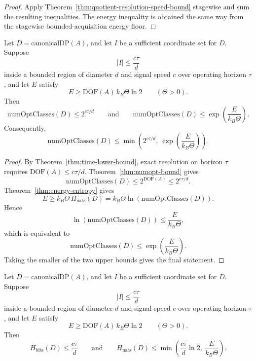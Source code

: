 \begin{proof}
Apply Theorem~\ref{thm:quotient-resolution-speed-bound} stagewise and sum the resulting inequalities. The energy inequality is obtained the same way from the stagewise bounded-acquisition energy floor.
\end{proof}

\begin{theorem}\label{thm:budget-class-bound}
Let $D = \mathrm{canonicalDP}(A)$, and let $I$ be a sufficient coordinate set for $D$. Suppose
\[
|I| \le \frac{c\tau}{d}
\]
inside a bounded region of diameter $d$ and signal speed $c$ over operating horizon $\tau$, and let $E$ satisfy
\[
E \ge \mathrm{DOF}(A)\,k_B \Theta \ln 2
\qquad (\Theta > 0).
\]
Then
\[
\mathrm{numOptClasses}(D) \le 2^{c\tau/d}
\qquad\text{and}\qquad
\mathrm{numOptClasses}(D) \le \exp\!\left(\frac{E}{k_B \Theta}\right).
\]
Consequently,
\[
\mathrm{numOptClasses}(D) \le
\min\!\left(2^{c\tau/d},\ \exp\!\left(\frac{E}{k_B \Theta}\right)\right).
\]
\end{theorem}

\begin{proof}
By Theorem~\ref{thm:time-lower-bound}, exact resolution on horizon $\tau$ requires $\mathrm{DOF}(A) \le c\tau/d$. Theorem~\ref{thm:numopt-bound} gives
\[
\mathrm{numOptClasses}(D) \le 2^{\mathrm{DOF}(A)} \le 2^{c\tau/d}.
\]
Theorem~\ref{thm:energy-entropy} gives
\[
E \ge k_B \Theta\, H_{\mathrm{nats}}(D) = k_B \Theta \ln(\mathrm{numOptClasses}(D)).
\]
Hence
\[
\ln(\mathrm{numOptClasses}(D)) \le \frac{E}{k_B \Theta},
\]
which is equivalent to
\[
\mathrm{numOptClasses}(D) \le \exp\!\left(\frac{E}{k_B \Theta}\right).
\]
Taking the smaller of the two upper bounds gives the final statement.
\end{proof}

\begin{corollary}\label{cor:budget-entropy-bound}
Let $D = \mathrm{canonicalDP}(A)$, and let $I$ be a sufficient coordinate set for $D$. Suppose
\[
|I| \le \frac{c\tau}{d}
\]
inside a bounded region of diameter $d$ and signal speed $c$ over operating horizon $\tau$, and let $E$ satisfy
\[
E \ge \mathrm{DOF}(A)\,k_B \Theta \ln 2
\qquad (\Theta > 0).
\]
Then
\[
H_{\mathrm{bits}}(D) \le \frac{c\tau}{d}
\qquad\text{and}\qquad
H_{\mathrm{nats}}(D) \le
\min\!\left(\frac{c\tau}{d}\ln 2,\ \frac{E}{k_B \Theta}\right).
\]
\end{corollary}


